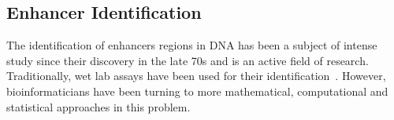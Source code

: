         


        
        \subsection{Enhancer Identification}
        
        The identification of enhancers regions in DNA has been a subject of intense study since their discovery in the late 70s and is an active field of research. Traditionally, wet lab assays have been used for their identification~\cite{rosenthal198772}. However, bioinformaticians have been turning to more mathematical, computational and statistical approaches in this problem. 
        
                

       
        
